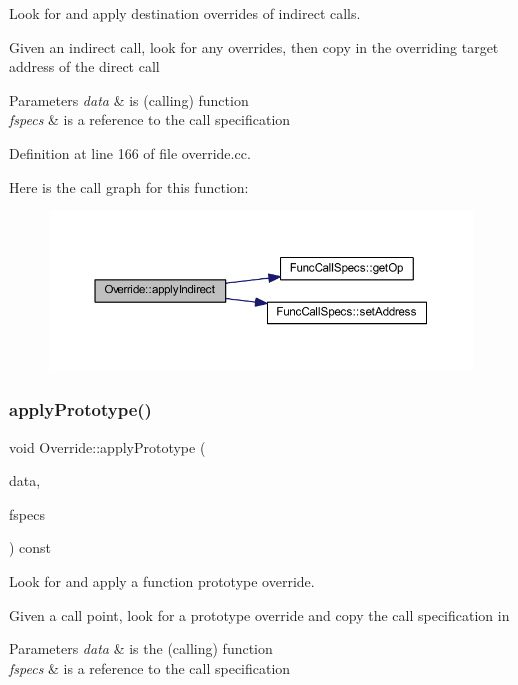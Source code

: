 Look for and apply destination overrides of indirect calls. 

Given an indirect call, look for any overrides, then copy in the overriding target address of the direct call 
\begin{DoxyParams}{Parameters}
{\em data} & is (calling) function \\
\hline
{\em fspecs} & is a reference to the call specification \\
\hline
\end{DoxyParams}


Definition at line 166 of file override.\+cc.

Here is the call graph for this function\+:
\nopagebreak
\begin{figure}[H]
\begin{center}
\leavevmode
\includegraphics[width=350pt]{class_override_aa3bc812ae7fb2d03f14d2d67adbb6ede_cgraph}
\end{center}
\end{figure}
\mbox{\label{class_override_a33eb920b5801c9c7cbd2334b16478ece}} 
\subsubsection{\texorpdfstring{applyPrototype()}{applyPrototype()}}
{\footnotesize\ttfamily void Override\+::apply\+Prototype (\begin{DoxyParamCaption}\item[{\mbox{\hyperlink{class_funcdata}{Funcdata}} \&}]{data,  }\item[{\mbox{\hyperlink{class_func_call_specs}{Func\+Call\+Specs}} \&}]{fspecs }\end{DoxyParamCaption}) const}



Look for and apply a function prototype override. 

Given a call point, look for a prototype override and copy the call specification in 
\begin{DoxyParams}{Parameters}
{\em data} & is the (calling) function \\
\hline
{\em fspecs} & is a reference to the call specification \\
\hline
\end{DoxyParams}


